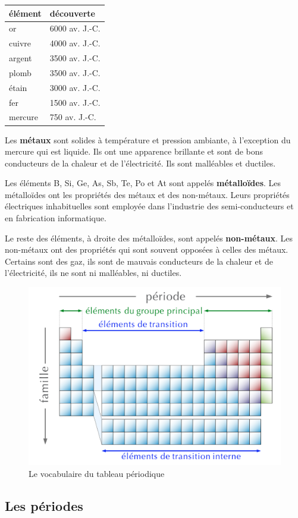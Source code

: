 \documentclass[
  11pt,
  a4paper,
  openany]{book}
\begin{document}
\begin{longtable}[]{@{}ll@{}}
\toprule()
élément & découverte \\
\midrule()
\endhead
or & 6000 av. J.-C. \\
cuivre & 4000 av. J.-C. \\
argent & 3500 av. J.-C. \\
plomb & 3500 av. J.-C. \\
étain & 3000 av. J.-C. \\
fer & 1500 av. J.-C. \\
mercure & 750 av. J.-C. \\
\bottomrule()
\end{longtable}

Les \textbf{métaux} sont solides à température et pression ambiante, à l'exception du mercure qui est liquide. Ils ont une apparence brillante et sont de bons conducteurs de la chaleur et de l'électricité. Ils sont malléables et ductiles.

Les éléments B, Si, Ge, As, Sb, Te, Po et At sont appelés \textbf{métalloïdes}. Les métalloïdes ont les propriétés des métaux et des non-métaux. Leurs propriétés électriques inhabituelles sont employée dans l'industrie des semi-conducteurs et en fabrication informatique.

Le reste des éléments, à droite des métalloïdes, sont appelés \textbf{non-métaux}. Les non-métaux ont des propriétés qui sont souvent opposées à celles des métaux. Certains sont des gaz, ils sont de mauvais conducteurs de la chaleur et de l'électricité, ils ne sont ni malléables, ni ductiles.

\begin{figure}

{\centering \includegraphics[width=0.45\linewidth]{images/tpe-empty} 

}

\caption{Le vocabulaire du tableau périodique}\label{fig:tpe-empty}
\end{figure}

\hypertarget{les-puxe9riodes}{%
\subsection{Les périodes}\label{les-puxe9riodes}}
\end{document}
